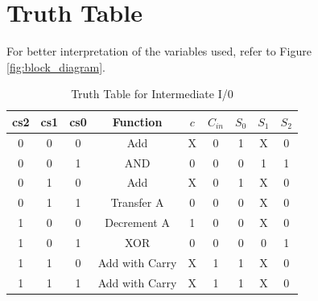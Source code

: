 \documentclass[12pt]{article}
\begin{document}
\section{\large{Truth Table}}
For better interpretation of the variables used, refer to Figure \ref{fig:block_diagram}.
\begin{table}[H]
    \centering
    \begin{tabular}{|ccc|c|c|c|c|c|c|}
    \hline
         cs2 & cs1 & cs0 & Function & $c$ & $C_{in}$ & $S_0$ & $S_1$ & $S_2$  \\
         \hline
         0 & 0 & 0 & Add & X & 0 & 1 & X & 0  \\
         0 & 0 & 1 & AND & 0 & 0 & 0 & 1 & 1 \\
         0 & 1 & 0 & Add & X & 0 & 1 & X & 0 \\
         0 & 1 & 1 & Transfer A & 0 & 0 & 0 & X & 0 \\
         1 & 0 & 0 & Decrement A & 1 & 0 & 0 & X & 0 \\
         1 & 0 & 1 & XOR & 0 & 0 & 0 & 0 & 1 \\
         1 & 1 & 0 & Add with Carry & X & 1 & 1 & X & 0 \\
         1 & 1 & 1 & Add with Carry & X & 1 & 1 & X & 0 \\
         \hline
    \end{tabular}
    \caption{Truth Table for Intermediate I/0}
    \label{tab:truth_table}
\end{table}


\newpage
\end{document}
